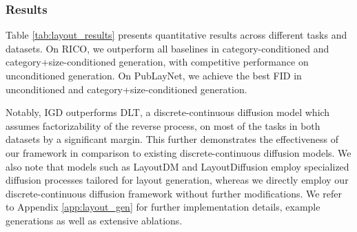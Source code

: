 \subsubsection{Results}
Table \ref{tab:layout_results} presents quantitative results across different tasks and datasets. On RICO, we outperform all baselines in category-conditioned and category+size-conditioned generation, with competitive performance on unconditioned generation. On PubLayNet, we achieve the best FID in unconditioned and category+size-conditioned generation.

Notably, IGD outperforms DLT, a discrete-continuous diffusion model which assumes factorizability of the reverse process, on most of the tasks in both datasets by a significant margin. This further demonstrates the effectiveness of our framework in comparison to existing discrete-continuous diffusion models.
We also note that models such as LayoutDM and LayoutDiffusion employ specialized diffusion processes tailored for layout generation, whereas we directly employ our discrete-continuous diffusion framework without further modifications. We refer to Appendix \ref{app:layout_gen} for further implementation details, example generations as well as extensive ablations.

